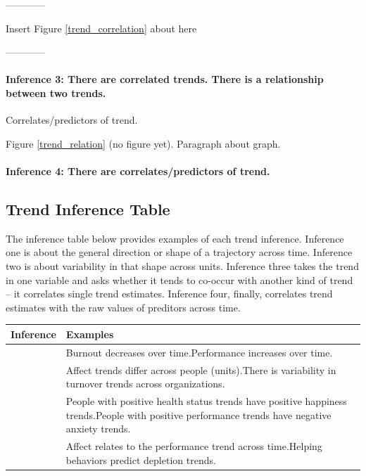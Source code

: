 \documentclass[english,,man]{apa6}
\let\oldparagraph\paragraph
\renewcommand{\paragraph}[1]{\oldparagraph{#1}\mbox{}}
\theoremstyle{definition}
\theoremstyle{definition}
\theoremstyle{definition}
\theoremstyle{remark}
\begin{document}
\begin{center}

------------

Insert Figure \ref{trend_correlation} about here

------------

\end{center}

\hypertarget{inference-3-there-are-correlated-trends.-there-is-a-relationship-between-two-trends.}{%
\paragraph{Inference 3: There are correlated trends. There is a
relationship between two
trends.}\label{inference-3-there-are-correlated-trends.-there-is-a-relationship-between-two-trends.}}

Correlates/predictors of trend.

Figure \ref{trend_relation} (no figure yet). Paragraph about graph.

\hypertarget{inference-4-there-are-correlatespredictors-of-trend.}{%
\paragraph{Inference 4: There are correlates/predictors of
trend.}\label{inference-4-there-are-correlatespredictors-of-trend.}}

\hypertarget{trend-inference-table}{%
\subsection{Trend Inference Table}\label{trend-inference-table}}

The inference table below provides examples of each trend inference.
Inference one is about the general direction or shape of a trajectory
across time. Inference two is about variability in that shape across
units. Inference three takes the trend in one variable and asks whether
it tends to co-occur with another kind of trend -- it correlates single
trend estimates. Inference four, finally, correlates trend estimates
with the raw values of preditors across time.

\begin{tabular}{>{\raggedright\arraybackslash}p{5em}>{\raggedright\arraybackslash}p{30em}}
\toprule
Inference & Examples\\
\midrule
1 & Burnout decreases over time.\newline Performance increases over time.\\
\hline
2 & Affect trends differ across people (units).\newline There is variability in turnover trends across organizations.\\
\hline
3 & People with positive health status trends have positive happiness trends.\newline People with positive performance trends have negative anxiety trends.\\
\hline
4 & Affect relates to the performance trend across time.\newline Helping behaviors predict depletion trends.\\
\bottomrule
\end{tabular}
\end{document}
